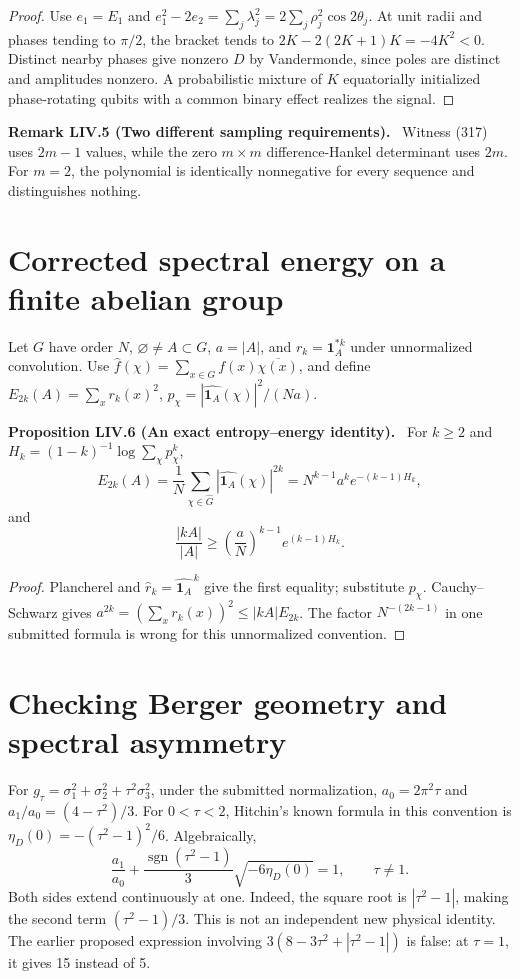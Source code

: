 \documentclass[11pt,a4paper,oneside]{book}
\newcommand{\one}{\mathbf 1}\newcommand{\ii}{\mathrm i}\newcommand{\dd}{\mathrm d}
\newcommand{\statement}[3]{\par\medskip\noindent\textbf{#1 #2 (#3).}\ }
\begin{document}
\begin{proof}
Use $e_1=E_1$ and $e_1^2-2e_2=\sum_j\lambda_j^2=2\sum_j\rho_j^2\cos2\theta_j$. At unit radii and phases tending to $\pi/2$, the bracket tends to $2K-2(2K+1)K=-4K^2<0$. Distinct nearby phases give nonzero $D$ by Vandermonde, since poles are distinct and amplitudes nonzero. A probabilistic mixture of $K$ equatorially initialized phase-rotating qubits with a common binary effect realizes the signal.
\end{proof}
\statement{Remark}{LIV.5}{Two different sampling requirements}
Witness (317) uses $2m-1$ values, while the zero $m\times m$ difference-Hankel determinant uses $2m$. For $m=2$, the polynomial is identically nonnegative for every sequence and distinguishes nothing.
\section{Corrected spectral energy on a finite abelian group}
Let $G$ have order $N$, $\varnothing\ne A\subset G$, $a=|A|$, and $r_k=\one_A^{*k}$ under unnormalized convolution. Use $\widehat f(\chi)=\sum_{x\in G}f(x)\overline{\chi(x)}$, and define $E_{2k}(A)=\sum_xr_k(x)^2$, $p_\chi=|\widehat{\one_A}(\chi)|^2/(Na)$.
\statement{Proposition}{LIV.6}{An exact entropy--energy identity}
For $k\ge2$ and $H_k=(1-k)^{-1}\log\sum_\chi p_\chi^k$,
\begin{equation}E_{2k}(A)=\frac1N\sum_{\chi\in\widehat G}|\widehat{\one_A}(\chi)|^{2k}=N^{k-1}a^ke^{-(k-1)H_k},\tag{319}\end{equation}
and
\begin{equation}\frac{|kA|}{|A|}\ge\left(\frac aN\right)^{k-1}e^{(k-1)H_k}.\tag{320}\end{equation}
\begin{proof}
Plancherel and $\widehat r_k=\widehat{\one_A}^{\,k}$ give the first equality; substitute $p_\chi$. Cauchy--Schwarz gives $a^{2k}=(\sum_xr_k(x))^2\le|kA|E_{2k}$. The factor $N^{-(2k-1)}$ in one submitted formula is wrong for this unnormalized convention.
\end{proof}
\section{Checking Berger geometry and spectral asymmetry}
For $g_\tau=\sigma_1^2+\sigma_2^2+\tau^2\sigma_3^2$, under the submitted normalization, $a_0=2\pi^2\tau$ and $a_1/a_0=(4-\tau^2)/3$. For $0<\tau<2$, Hitchin's known formula in this convention is $\eta_D(0)=-(\tau^2-1)^2/6$. Algebraically,
\begin{equation}\frac{a_1}{a_0}+\frac{\operatorname{sgn}(\tau^2-1)}3\sqrt{-6\eta_D(0)}=1,\qquad\tau\ne1.\tag{321}\end{equation}
Both sides extend continuously at one. Indeed, the square root is $|\tau^2-1|$, making the second term $(\tau^2-1)/3$. This is not an independent new physical identity. The earlier proposed expression involving $3(8-3\tau^2+|\tau^2-1|)$ is false: at $\tau=1$, it gives 15 instead of 5.
\end{document}
